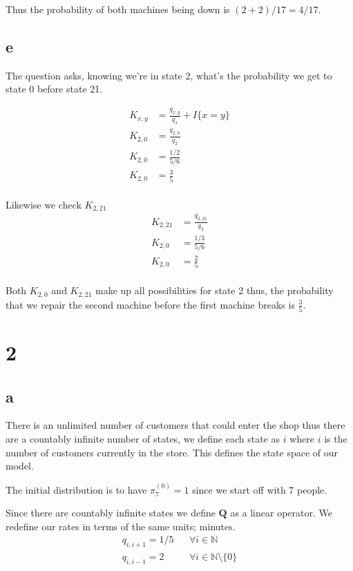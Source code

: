 \documentclass{article}
\begin{document}
Thus the probability of both machines being down is $(2+2)/17 = 4/17$.

\subsection{e}
The question asks, knowing we're in state 2, what's the probability we
get to state 0 before state 21.

\begin{align*}
    K_{x,y} &= \frac{q_{x,y}}{q_x} + I\{x=y\} \\
    K_{2,0} &= \frac{q_{2,0}}{q_2} \\
    K_{2,0} &= \frac{1/2}{5/6} \\
    K_{2,0} &= \frac{3}{5} \\
\end{align*}

Likewise we check $K_{2,21}$
\begin{align*}
    K_{2,21} &= \frac{q_{2,21}}{q_2} \\
    K_{2,0} &= \frac{1/3}{5/6} \\
    K_{2,0} &= \frac{2}{5} \\
\end{align*}

Both $K_{2,0}$ and $K_{2,21}$ make up all possibilities for state 2 thus,
the probability that we repair the second machine before the first
machine breaks is $\frac{3}{5}$.

\section{2}
\subsection{a}
There is an unlimited number of customers that could enter the shop thus there
are a countably infinite number of states, we define each state as $i$ where $i$
is the number of customers currently in the store.
This defines the state space of our model.

The initial distribution is to have $\pi^{(0)}_7 = 1$ since we start off with 7 
people.

Since there are countably infinite states we define $\bm{Q}$ as a linear
operator. We redefine our rates in terms of the same units; minutes.
\begin{align*}
    q_{i, i+1} = 1/5 && \forall i \in \mathbb{N} \\
    q_{i, i-1} = 2 && \forall i \in \mathbb{N}\setminus\{0\}
\end{align*}
\end{document}
